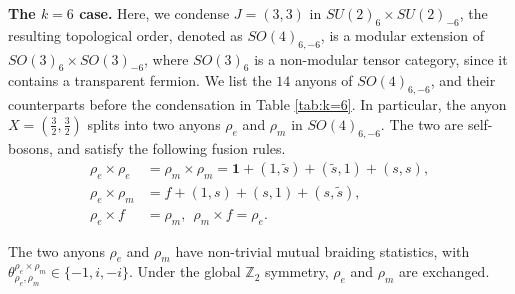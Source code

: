 \documentclass[aps, prl, superscriptaddress, twocolumn,
notitlepage, longbibliography,
floatfix]{revtex4-2}
\newcommand{\1}{\text{\uppercase\expandafter{\romannumeral1}}}
\newcommand{\2}{\text{\uppercase\expandafter{\romannumeral2}}}
\newcommand{\3}{\text{\uppercase\expandafter{\romannumeral3}}}
\newcommand{\4}{\text{\uppercase\expandafter{\romannumeral4}}}
\newcommand{\5}{\text{\uppercase\expandafter{\romannumeral5}}}
\newcommand{\6}{\text{\uppercase\expandafter{\romannumeral6}}}
\begin{document}
\textbf{\boldmath The $k=6$ case.} Here, we condense $J=(3,3)$ in $SU(2)_6\times SU(2)_{-6}$, the resulting topological order, denoted as $SO(4)_{6,-6}$, is a modular extension of $SO(3)_6\times SO(3)_{-6}$, where $SO(3)_6$ is a non-modular tensor category, since it contains a transparent fermion.\cite{PhysRevX.3.041016} We list the $14$ anyons of $SO(4)_{6,-6}$, and their counterparts before the condensation in Table \ref{tab:k=6}. In particular, the anyon $X=\left(\frac{3}{2},\frac{3}{2}\right)$ splits into two anyons $\rho_e$ and $\rho_m$ in $SO(4)_{6,-6}$. The two are self-bosons, and satisfy the following fusion rules.
\begin{align}
\rho_e\times \rho_e&=\rho_m\times \rho_m=\mathbf{1}+(1,\tilde{s})+(\tilde{s},1)+(s,s),\nonumber\\
\rho_e \times \rho_m &=f+ (1,s)+(s,1)+ (s,\tilde{s}),\\
\rho_e \times f &= \rho_m,~~\rho_m\times f = \rho_e.\nonumber
\end{align}




The two anyons $\rho_e$ and $\rho_m$ have non-trivial mutual braiding statistics, with $\theta_{\rho_e,\rho_m}^{\rho_{e}\times \rho_m}\in \{-1,i,-i\}$. Under the global $\mathbb{Z}_2$ symmetry, $\rho_e$ and $\rho_m$ are exchanged.
\end{document}
